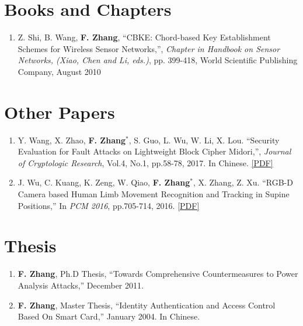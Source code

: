 \documentclass[11pt]{article}
\begin{document}
\section*{Books and Chapters}
\begin{enumerate}
\item Z. Shi, B. Wang, {\bf F. Zhang}, ``CBKE: Chord-based Key Establishment Schemes for Wireless Sensor Networks,'', {\it Chapter in Handbook on Sensor Networks, (Xiao, Chen and Li, eds.)}, pp.  399-418, World Scientific Publishing Company, August 2010
\end{enumerate}

\section*{Other Papers}
\begin{enumerate}
\item Y. Wang, X. Zhao, {\bf F. Zhang}$^\ast$, S. Guo, L. Wu, W. Li, X. Lou. ``Security Evaluation for Fault Attacks on Lightweight Block Cipher Midori,'', {\it Journal of Cryptologic Research}, Vol.4, No.1, pp.58-78, 2017. In Chinese. \href{http://www.isee.zju.edu.cn/fanzhang/publications/2017\_JCR\_Midori.pdf}{[PDF]}  
    
\item J. Wu, C. Kuang, K. Zeng, W. Qiao, {\bf F. Zhang}$^\ast$, X. Zhang, Z. Xu. ``RGB-D Camera based Human Limb Movement Recognition and Tracking in Supine Positions,'' In {\it PCM 2016}, pp.705-714, 2016. \href{http://www.isee.zju.edu.cn/fanzhang/publications/2016\_PCM\_RGB.pdf}{[PDF]}
\end{enumerate}

\section*{Thesis}
\begin{enumerate}
\item {\bf F. Zhang}, Ph.D Thesis, ``Towards Comprehensive Countermeasures to Power Analysis Attacks,'' December 2011.

\item {\bf F. Zhang}, Master Thesis, ``Identity Authentication and Access Control Based On Smart Card,'' January 2004. In Chinese.
\end{enumerate}

\end{document}
